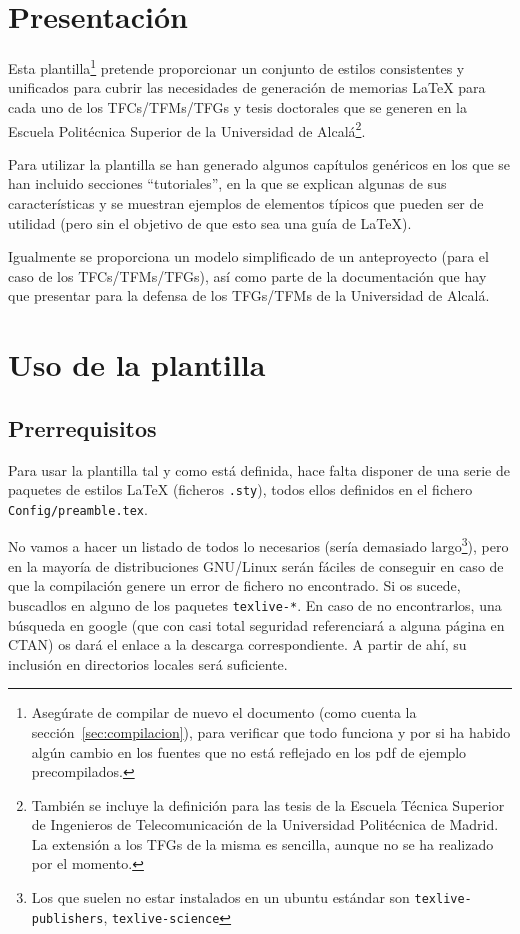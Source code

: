 \documentclass[spanish,openright]{book}
\begin{document}
\section{Presentación}
\label{sec:presentacion}


Esta plantilla\footnote{Asegúrate de compilar de nuevo el documento
  (como cuenta la sección~\ref{sec:compilacion}), para verificar que
  todo funciona y por si ha habido algún cambio en los fuentes que no
  está reflejado en los pdf de ejemplo precompilados.} pretende
proporcionar un conjunto de estilos consistentes y unificados para
cubrir las necesidades de generación de memorias \LaTeX{} para cada uno
de los TFCs/TFMs/TFGs y tesis doctorales que se generen en la Escuela
Politécnica Superior de la Universidad de Alcalá\footnote{También se
  incluye la definición para las tesis de la Escuela Técnica Superior de
  Ingenieros de Telecomunicación de la Universidad Politécnica de
  Madrid. La extensión a los TFGs de la misma es sencilla, aunque no se
  ha realizado por el momento.}.

Para utilizar la plantilla se han generado algunos capítulos genéricos
en los que se han incluido secciones ``tutoriales'', en la que se
explican algunas de sus características y se muestran ejemplos de
elementos típicos que pueden ser de utilidad (pero sin el objetivo de
que esto sea una guía de \LaTeX{}).

Igualmente se proporciona un modelo simplificado de un anteproyecto
(para el caso de los TFCs/TFMs/TFGs), así como parte de la documentación
que hay que presentar para la defensa de los TFGs/TFMs de la Universidad
de Alcalá.



\section{Uso de la plantilla}
\label{sec:uso-generico-de}


\subsection{Prerrequisitos}
\label{sec:prerrequisitos}

Para usar la plantilla tal y como está definida, hace falta disponer de
una serie de paquetes de estilos \LaTeX{} (ficheros \texttt{.sty}),
todos ellos definidos en el fichero \texttt{Config/preamble.tex}.

No vamos a hacer un listado de todos lo necesarios (sería demasiado
largo\footnote{Los que suelen no estar instalados en un ubuntu estándar
  son \texttt{texlive-publishers}, \texttt{texlive-science}}), pero en
la mayoría de distribuciones GNU/Linux serán fáciles de conseguir en
caso de que la compilación genere un error de fichero no encontrado. Si
os sucede, buscadlos en alguno de los paquetes \texttt{texlive-*}. En
caso de no encontrarlos, una búsqueda en google (que con casi total
seguridad referenciará a alguna página en CTAN) os dará el enlace a la
descarga correspondiente. A partir de ahí, su inclusión en directorios
locales será suficiente.
\end{document}
